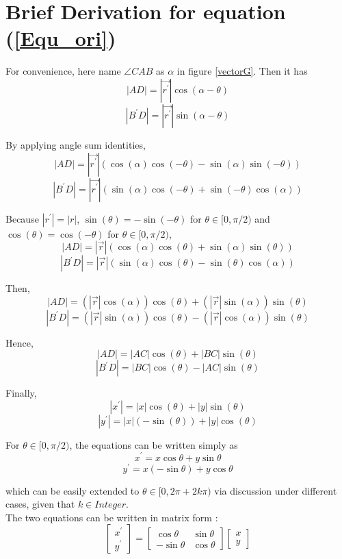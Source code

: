 \section{Brief Derivation for equation (\ref{Equ_ori})}
\par\noindent

For convenience, here name $\angle CAB $ as $\alpha$ in figure \ref{vectorG}. Then it has
$$|AD| = |\vec{r^{'}}| \cos(\alpha - \theta)$$
$$|B^{'}D| = |\vec{r^{'}}| \sin(\alpha - \theta)$$

By applying angle sum identities,
$$|AD| = |\vec{r^{'}}| (\cos(\alpha)\cos(-\theta) - \sin(\alpha)\sin(-\theta))$$
$$|B^{'}D| = |\vec{r^{'}}| (\sin(\alpha)\cos(-\theta) + \sin(-\theta)\cos(\alpha))$$

Because $|r^{'}| = |r|$, $\sin(\theta) = - \sin(-\theta)$ for $\theta \in [0, \pi/2)$ and $\cos(\theta) = \cos(-\theta)$ for $\theta \in [0, \pi/2)$,
$$|AD| = |\vec{r}| (\cos(\alpha)\cos(\theta) + \sin(\alpha)\sin(\theta))$$
$$|B^{'}D| = |\vec{r}| (\sin(\alpha)\cos(\theta) - \sin(\theta)\cos(\alpha))$$

Then,
$$|AD| = (|\vec{r}|\cos(\alpha))\cos(\theta) + (|\vec{r}|\sin(\alpha))\sin(\theta)$$
$$|B^{'}D| = (|\vec{r}|\sin(\alpha))\cos(\theta) - (|\vec{r}|\cos(\alpha))\sin(\theta)$$

Hence,
$$|AD| = |AC|\cos(\theta) + |BC|\sin(\theta)$$
$$|B^{'}D| = |BC|\cos(\theta) - |AC|\sin(\theta)$$

Finally,
$$|x^{'}| = |x|\cos(\theta) + |y|\sin(\theta)$$
$$|y^{'}| = |x|(- \sin(\theta)) + |y|\cos(\theta)$$

For $\theta \in [0, \pi/2)$, the equations can be written simply as
$$ x^{'} = x\cos\theta + y\sin\theta$$
$$ y^{'} = x(- \sin\theta) + y\cos\theta$$

which can be easily extended to $\theta \in [ 0, 2\pi + 2k\pi)$ via discussion under different cases, given that $k \in Integer$.\\

The two equations can be written in matrix form :
\begin{equation*}
  \begin{bmatrix}
   x^{'} \\ y^{'}
   \end{bmatrix} =   \begin{bmatrix}
      \cos\theta & \sin\theta \\
      -\sin\theta & \cos\theta
    \end{bmatrix} \begin{bmatrix}
      x \\ y
     \end{bmatrix}
\end{equation*}
